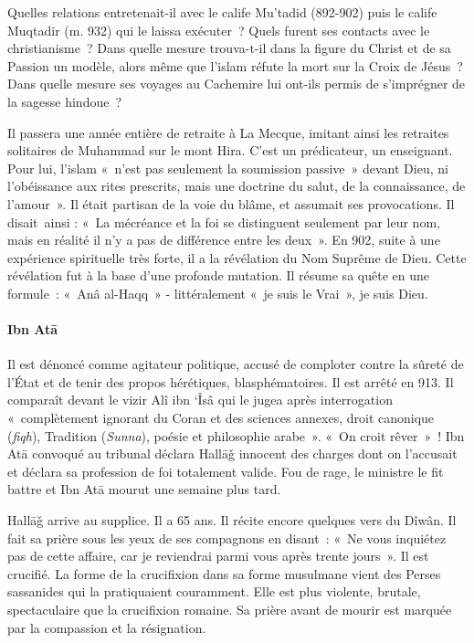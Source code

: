 Quelles relations entretenait-il avec le calife Mu'tadid (892-902) puis
le calife Muqtadir (m. 932) qui le laissa exécuter~? Quels furent ses
contacts avec le christianisme~? Dans quelle mesure trouva-t-il dans la
figure du Christ et de sa Passion un modèle, alors même que l'islam
réfute la mort sur la Croix de Jésus~? Dans quelle mesure ses voyages au
Cachemire lui ont-ils permis de s'imprégner de la sagesse hindoue~?

Il passera une année entière de retraite à La Mecque, imitant ainsi les
retraites solitaires de Muhammad sur le mont Hira. C'est un prédicateur,
un enseignant. Pour lui, l'islam «~n'est pas seulement la soumission
passive~» devant Dieu, ni l'obéissance aux rites prescrits, mais une
doctrine du salut, de la connaissance, de l'amour~». Il était partisan
de la voie du blâme, et assumait ses provocations. Il disait~ainsi :
«~La mécréance et la foi se distinguent seulement par leur nom, mais en
réalité il n'y a pas de différence entre les deux~». En 902, suite à une
expérience spirituelle très forte, il a la révélation du Nom Suprême de
Dieu. Cette révélation fut à la base d'une profonde mutation. Il résume
sa quête en une formule~: «~Anâ al-Haqq~» - littéralement «~je suis le
Vrai~», je suis Dieu.

 
\paragraph{Ibn Atā}\label{ibn-atux101}

Il est dénoncé comme agitateur politique, accusé de comploter contre la
sûreté de l'État et de tenir des propos hérétiques, blasphématoires. Il
est arrêté en 913. Il comparaît devant le vizir Alî ibn `Îsâ qui le
jugea après interrogation «~complètement ignorant du Coran et des
sciences annexes, droit canonique (\emph{fiqh}), Tradition
(\emph{Sunna}), poésie et philosophie arabe~». «~On croit rêver~»~! Ibn Atā convoqué au
tribunal déclara Hallāǧ innocent des charges dont on l'accusait et
déclara sa profession de foi totalement valide. Fou de rage, le ministre
le fit battre et Ibn Atā mourut une semaine plus tard.

Hallāǧ arrive au supplice. Il a 65 ans. Il récite encore quelques vers
du Dîwân. Il fait sa prière sous les yeux de ses compagnons en disant~:
«~Ne vous inquiétez pas de cette affaire, car je reviendrai parmi vous
après trente jours~». Il est crucifié. La forme de la crucifixion dans
sa forme musulmane vient des Perses sassanides qui la pratiquaient
couramment. Elle est plus violente, brutale, spectaculaire que la
crucifixion romaine. Sa prière avant de mourir est marquée par la
compassion et la résignation.


